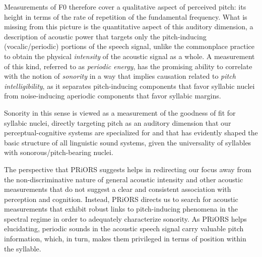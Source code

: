 Measurements of F0 therefore cover a qualitative aspect of perceived pitch: its height in terms of the rate of repetition of the fundamental frequency.
What is missing from this picture is the quantitative aspect of this auditory dimension, a description of acoustic power that targets only the pitch-inducing (vocalic/periodic) portions of the speech signal, unlike the commonplace practice to obtain the physical \emph{intensity} of the acoustic signal as a whole. A measurement of this kind, referred to as \emph{periodic energy}, has the promising ability to correlate with the notion of \emph{sonority} in a way that implies causation related to \emph{pitch intelligibility}, as it separates pitch-inducing components that favor syllabic nuclei from noise-inducing aperiodic components that favor syllabic margins.

Sonority in this sense is viewed as a measurement of the goodness of fit for syllabic nuclei, directly targeting pitch as an auditory dimension that our perceptual-cognitive systems are specialized for and that has evidently shaped the basic structure of all linguistic sound systems, given the universality of syllables with sonorous/pitch-bearing nuclei.

The perspective that PRiORS suggests helps in redirecting our focus away from the non-discriminative nature of general acoustic intensity and other acoustic measurements that do not suggest a clear and consistent association with perception and cognition. Instead, PRiORS directs us to search for acoustic measurements that exhibit robust links to pitch-inducing phenomena in the spectral regime in order to adequately characterize sonority.
As PRiORS helps elucidating, periodic sounds in the acoustic speech signal carry valuable pitch information, which, in turn, makes them privileged in terms of position within the syllable.
